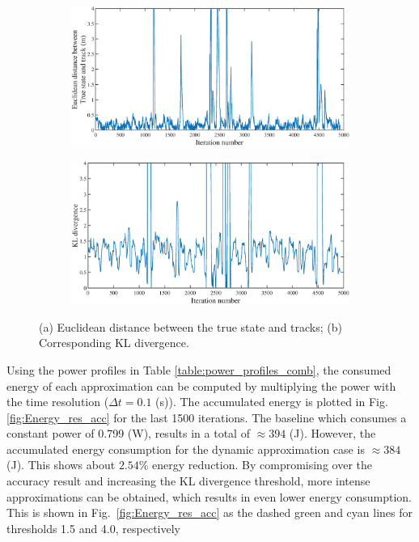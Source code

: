 \begin{figure}
    \centering
    \begin{subfigure}[tb]{0.5\textwidth}
        \includegraphics[width=\textwidth]{img/Err_figure_cropped.eps}
        \caption{}
        \label{fig:gull}
    \end{subfigure}
    \begin{subfigure}[tb]{0.5\textwidth}
        \includegraphics[width=\textwidth]{img/KL_figure_cropped.eps}
        \caption{}
        \label{fig:tiger}
    \end{subfigure}
    \caption{(a) Euclidean distance between the true state and tracks; (b) Corresponding KL divergence.}
    \label{fig:KL_and_err}
\end{figure}

Using the power profiles in Table \ref{table:power_profiles_comb}, the consumed energy of each approximation can be computed by multiplying the power with the time resolution ($\Delta t = 0.1$ (s)). The accumulated energy is plotted in Fig. \ref{fig:Energy_res_acc} for the last 1500 iterations. 
The baseline which consumes a constant power of 0.799 (W), results in a total of $\approx 394$ (J). However, the accumulated energy consumption for the dynamic approximation case is $\approx 384$ (J). This shows about $2.54 \%$ energy reduction.
By compromising over the accuracy result and increasing the KL divergence threshold, more intense approximations can be obtained, which results in even lower energy consumption. This is shown in Fig.~\ref{fig:Energy_res_acc} as the dashed green and cyan lines for thresholds 1.5 and 4.0, respectively

